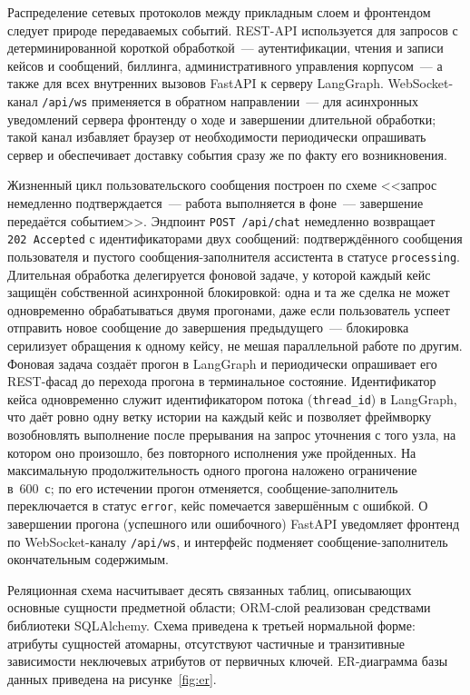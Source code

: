 Распределение сетевых протоколов между прикладным слоем и фронтендом следует природе передаваемых событий. REST-API используется для запросов с детерминированной короткой обработкой~--- аутентификации, чтения и записи кейсов и сообщений, биллинга, административного управления корпусом~--- а также для всех внутренних вызовов FastAPI к серверу LangGraph. WebSocket-канал \texttt{/api/ws} применяется в обратном направлении~--- для асинхронных уведомлений сервера фронтенду о ходе и завершении длительной обработки; такой канал избавляет браузер от необходимости периодически опрашивать сервер и обеспечивает доставку события сразу же по факту его возникновения.

Жизненный цикл пользовательского сообщения построен по схеме <<запрос немедленно подтверждается~--- работа выполняется в фоне~--- завершение передаётся событием>>. Эндпоинт \texttt{POST /api/chat} немедленно возвращает \texttt{202~Accepted} с идентификаторами двух сообщений: подтверждённого сообщения пользователя и пустого сообщения-заполнителя ассистента в статусе \texttt{processing}. Длительная обработка делегируется фоновой задаче, у которой каждый кейс защищён собственной асинхронной блокировкой: одна и та же сделка не может одновременно обрабатываться двумя прогонами, даже если пользователь успеет отправить новое сообщение до завершения предыдущего~--- блокировка серилизует обращения к одному кейсу, не мешая параллельной работе по другим. Фоновая задача создаёт прогон в LangGraph и периодически опрашивает его REST-фасад до перехода прогона в терминальное состояние. Идентификатор кейса одновременно служит идентификатором потока (\texttt{thread\_id}) в LangGraph, что даёт ровно одну ветку истории на каждый кейс и позволяет фреймворку возобновлять выполнение после прерывания на запрос уточнения с того узла, на котором оно произошло, без повторного исполнения уже пройденных. На максимальную продолжительность одного прогона наложено ограничение в~600~с; по его истечении прогон отменяется, сообщение-заполнитель переключается в статус \texttt{error}, кейс помечается завершённым с ошибкой. О завершении прогона (успешного или ошибочного) FastAPI уведомляет фронтенд по WebSocket-каналу \texttt{/api/ws}, и интерфейс подменяет сообщение-заполнитель окончательным содержимым.

Реляционная схема насчитывает десять связанных таблиц, описывающих основные сущности предметной области; ORM-слой реализован средствами библиотеки SQLAlchemy. Схема приведена к третьей нормальной форме: атрибуты сущностей атомарны, отсутствуют частичные и транзитивные зависимости неключевых атрибутов от первичных ключей. ER-диаграмма базы данных приведена на рисунке~\ref{fig:er}.

